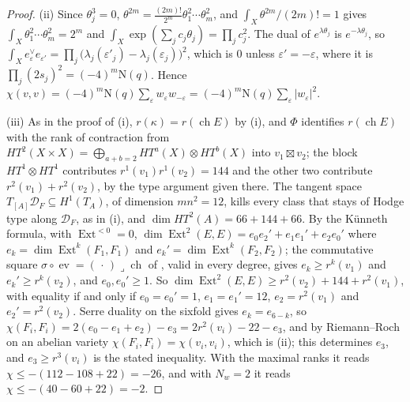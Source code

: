 \documentclass[11pt,reqno]{amsart}
\theoremstyle{plain}
\theoremstyle{definition}
\theoremstyle{remark}
\newcommand{\cD}{\mathcal{D}}
\newcommand{\Nm}{\mathrm{N}}             %
\DeclareMathOperator{\ch}{ch}
\DeclareMathOperator{\Ext}{Ext}
\begin{document}
\begin{proof}
(ii) Since $\theta_{j}^{3}=0$, $\theta^{2m}=\frac{(2m)!}{2^{m}}\theta_{1}^{2}
\cdots\theta_{m}^{2}$, and $\int_{X}\theta^{2m}/(2m)!=1$ gives
$\int_{X}\theta_{1}^{2}\cdots\theta_{m}^{2}=2^{m}$ and
$\int_{X}\exp(\sum_{j}c_{j}\theta_{j})=\prod_{j}c_{j}^{2}$. The dual of
$e^{\lambda\theta_{j}}$ is $e^{-\lambda\theta_{j}}$, so
$\int_{X}e_{\varepsilon}^{\vee}e_{\varepsilon'}=\prod_{j}\bigl(\lambda_{j}(\varepsilon'_{j})
-\lambda_{j}(\varepsilon_{j})\bigr)^{2}$, which is $0$ unless
$\varepsilon'=-\varepsilon$, where it is $\prod_{j}(2s_{j})^{2}=(-4)^{m}\Nm(q)$.
Hence $\chi(v,v)=(-4)^{m}\Nm(q)\sum_{\varepsilon}w_{\varepsilon}w_{-\varepsilon}
=(-4)^{m}\Nm(q)\sum_{\varepsilon}|w_{\varepsilon}|^{2}$.

(iii) As in the proof of (i), $r(\kappa)=r(\ch E)$
by (i), and $\Phi$ identifies $r(\ch E)$ with the rank of
contraction from $HT^{2}(X\times X)=\bigoplus_{a+b=2}HT^{a}(X)\otimes HT^{b}(X)$
into $v_{1}\boxtimes v_{2}$; the block $HT^{1}\otimes HT^{1}$ contributes
$r^{1}(v_{1})r^{1}(v_{2})=144$ and the other two contribute
$r^{2}(v_{1})+r^{2}(v_{2})$, by the type argument given there. The tangent
space $T_{[A]}\cD_{F}\subseteq H^{1}(T_{A})$, of dimension $mn^{2}=12$, kills
every class that stays of Hodge type along $\cD_{F}$, as in
(i), and $\dim HT^{2}(A)=66+144+66$. By the K\"unneth
formula, with $\Ext^{<0}=0$,
$\dim\Ext^{2}(E,E)=e_{0}e_{2}'+e_{1}e_{1}'+e_{2}e_{0}'$ where
$e_{k}=\dim\Ext^{k}(F_{1},F_{1})$ and $e_{k}'=\dim\Ext^{k}(F_{2},F_{2})$; the
commutative square $\sigma\circ\operatorname{ev}=(\,\cdot\,)\lrcorner\ch$ of
, valid in every degree, gives $e_{k}\ge r^{k}(v_{1})$
and $e_{k}'\ge r^{k}(v_{2})$, and $e_{0},e_{0}'\ge1$. So
$\dim\Ext^{2}(E,E)\ge r^{2}(v_{2})+144+r^{2}(v_{1})$, with equality if and
only if $e_{0}=e_{0}'=1$, $e_{1}=e_{1}'=12$, $e_{2}=r^{2}(v_{1})$ and
$e_{2}'=r^{2}(v_{2})$. Serre duality on the sixfold gives $e_{k}=e_{6-k}$, so
$\chi(F_{i},F_{i})=2(e_{0}-e_{1}+e_{2})-e_{3}=2r^{2}(v_{i})-22-e_{3}$, and by
Riemann--Roch on an abelian variety $\chi(F_{i},F_{i})=\chi(v_{i},v_{i})$,
which is (ii); this determines $e_{3}$, and $e_{3}\ge r^{3}(v_{i})$ is the
stated inequality. With the maximal ranks it reads
$\chi\le-(112-108+22)=-26$, and with $N_{w}=2$ it reads
$\chi\le-(40-60+22)=-2$.


\end{proof}
\end{document}
